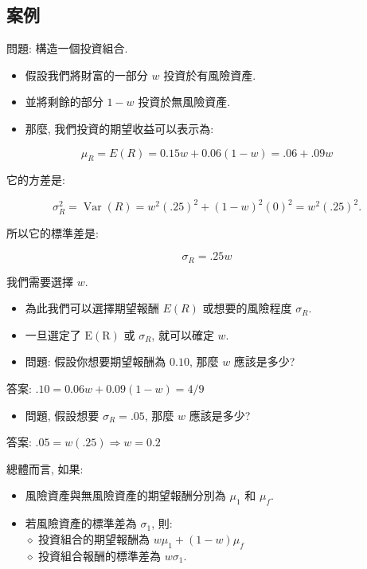 \documentclass[letterpaper]{article}
\begin{document}
		\subsection{案例}
		問題: 構造一個投資組合.
		
		\begin{itemize}
			\item 假設我們將財富的一部分 $w$ 投資於有風險資產.
			\item 並將剩餘的部分 $1-w$ 投資於無風險資產.
			\item 那麼, 我們投資的期望收益可以表示為: 
		\end{itemize}
		
		
		$$
		\mu_{R}=E (R)=0.15 w+0.06 (1-w)=.06+.09 w
		$$
		
		它的方差是: 
		
		$$
		\sigma_{R}^{2}=\operatorname{Var} (R)=w^{2} (.25)^{2}+ (1-w)^{2} (0)^{2}=w^{2} (.25)^{2} .
		$$
		
		所以它的標準差是: 
		
		$$
		\sigma_{R}=.25 w
		$$
		
		我們需要選擇 $w$.
		
		\begin{itemize}
			\item 為此我們可以選擇期望報酬 $E (R)$ 或想要的風險程度 $\sigma_{R}$. 
			\item 一旦選定了 $\mathrm{E} (\mathrm{R})$ 或 $\sigma_{R}$, 就可以確定 $w$. 
			\item 問題: 假設你想要期望報酬為 $0.10$, 那麼 $w$ 應該是多少?
		\end{itemize}
		
		答案: $.10=0.06 w+0.09 (1-w)=4/9$
		
		\begin{itemize}
			\item 問題, 假設想要 $\sigma_{R}=.05$, 那麼 $w$ 應該是多少?
		\end{itemize}
		
		答案: $.05=w (.25) \Longrightarrow w=0.2$
		
		
		總體而言, 如果:
		
		\begin{itemize}
			\item 風險資產與無風險資產的期望報酬分別為 $\mu_{1}$ 和 $\mu_{f}$. 
			\item 若風險資產的標準差為 $\sigma_{1}$, 則: \\
			$\diamond$ 投資組合的期望報酬為 $w \mu_{1}+ (1-w) \mu_{f}$\\
			$\diamond$ 投資組合報酬的標準差為 $w \sigma_{1}$. 
		\end{itemize}
		
\end{document}
